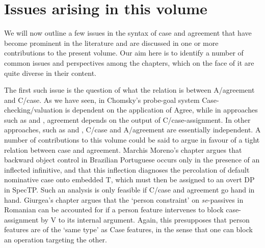 \documentclass[output=paper]{langsci/langscibook}
\begin{document}
\section{Issues arising in this volume}

We will now outline a few issues in the syntax of case and agreement that have become prominent in the literature and are discussed in one or more contributions to the present volume. Our aim here is to identify a number of common issues and perspectives among the chapters, which on the face of it are quite diverse in their content.

The first such issue is the question of what the relation is between A/agreement and C/case. As we have seen, in Chomsky’s probe-goal system Case-checking/valuation is dependent on the application of Agree, while in approaches such as \citet{Bobaljik2008} and \citet{Preminger2014}, agreement depends on the output of C/case-assignment. In other approaches, such as \citet{Baker2015} and \citet{Manzini2016}, C/case and A/agreement are essentially independent. A number of contributions to this volume could be said to argue in favour of a tight relation between case and agreement. Marchis Moreno’s chapter argues that backward object control in Brazilian Portuguese occurs only in the presence of an inflected infinitive, and that this inflection diagnoses the percolation of default nominative case onto embedded T, which must then be assigned to an overt DP in SpecTP. Such an analysis is only feasible if C/case and agreement go hand in hand. Giurgea’s chapter argues that the ‘person constraint’ on \textit{se}{}-passives in Romanian can be accounted for if a person feature intervenes to block case-assignment by V to its internal argument. Again, this presupposes that person features are of the ‘same type’ as Case features, in the sense that one can block an operation targeting the other.
\end{document}
